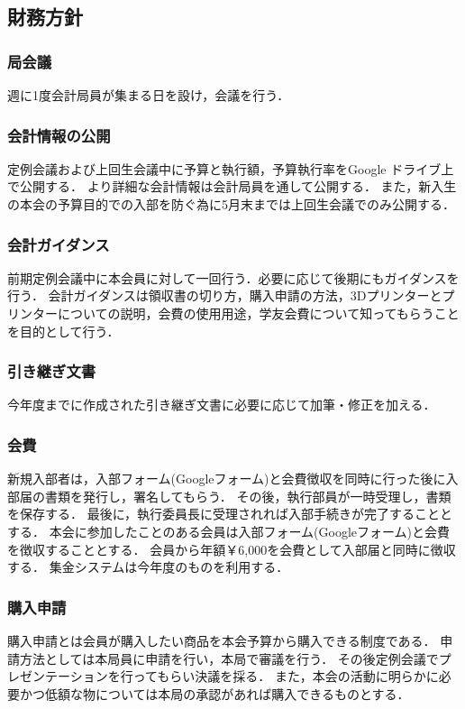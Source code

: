 \subsection*{財務方針}


\subsubsection*{局会議}
週に1度会計局員が集まる日を設け，会議を行う．

\subsubsection*{会計情報の公開}
定例会議および上回生会議中に予算と執行額，予算執行率をGoogle ドライブ上で公開する．
より詳細な会計情報は会計局員を通して公開する．
また，新入生の本会の予算目的での入部を防ぐ為に5月末までは上回生会議でのみ公開する．

\subsubsection*{会計ガイダンス}
前期定例会議中に本会員に対して一回行う．必要に応じて後期にもガイダンスを行う．
会計ガイダンスは領収書の切り方，購入申請の方法，3Dプリンターとプリンターについての説明，会費の使用用途，学友会費について知ってもらうことを目的として行う．

\subsubsection*{引き継ぎ文書}
今年度までに作成された引き継ぎ文書に必要に応じて加筆・修正を加える．

\subsubsection*{会費}
新規入部者は，入部フォーム(Googleフォーム)と会費徴収を同時に行った後に入部届の書類を発行し，署名してもらう．
その後，執行部員が一時受理し，書類を保存する．
最後に，執行委員長に受理されれば入部手続きが完了することとする．
本会に参加したことのある会員は入部フォーム(Googleフォーム)と会費を徴収することとする．
会員から年額￥6,000を会費として入部届と同時に徴収する．
集金システムは今年度のものを利用する．

\subsubsection*{購入申請}
購入申請とは会員が購入したい商品を本会予算から購入できる制度である．
申請方法としては本局員に申請を行い，本局で審議を行う．
その後定例会議でプレゼンテーションを行ってもらい決議を採る．
また，本会の活動に明らかに必要かつ低額な物については本局の承認があれば購入できるものとする．

